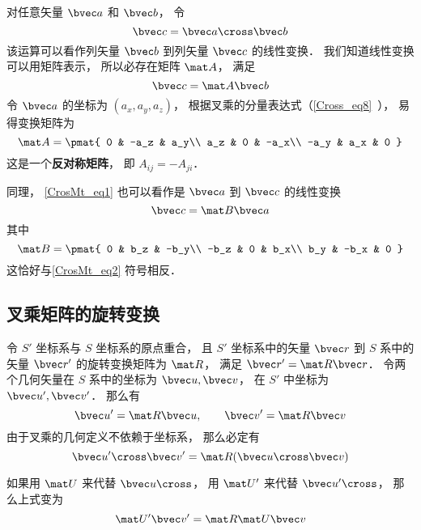 
对任意矢量 $\bvec a$ 和 $\bvec b$， 令
\begin{equation}\label{CrosMt_eq1}
\bvec c = \bvec a \cross \bvec b
\end{equation}
该运算可以看作列矢量 $\bvec b$ 到列矢量 $\bvec c$ 的线性变换． 我们知道线性变换可以用矩阵表示， 所以必存在矩阵 $\mat A$， 满足
\begin{equation}\label{CrosMt_eq3}
\bvec c = \mat A \bvec b
\end{equation}
令 $\bvec a$ 的坐标为 $(a_x, a_y, a_z)$， 根据叉乘的分量表达式（\autoref{Cross_eq8}~）， 易得变换矩阵为
\begin{equation}\label{CrosMt_eq2}
\mat A = \pmat{
0 & -a_z & a_y\\
a_z & 0 & -a_x\\
-a_y & a_x & 0
}
\end{equation}
这是一个\textbf{反对称矩阵}， 即 $A_{ij} = -A_{ji}$．

同理， \autoref{CrosMt_eq1} 也可以看作是 $\bvec a$ 到 $\bvec c$ 的线性变换
\begin{equation}
\bvec c = \mat B \bvec a
\end{equation}
其中
\begin{equation}
\mat B = \pmat{
0 & b_z & -b_y\\
-b_z & 0 & b_x\\
b_y & -b_x & 0
}
\end{equation}
这恰好与\autoref{CrosMt_eq2} 符号相反．

\subsection{叉乘矩阵的旋转变换}
令 $S'$ 坐标系与 $S$ 坐标系的原点重合， 且 $S'$ 坐标系中的矢量 $\bvec r$ 到 $S$ 系中的矢量 $\bvec r'$ 的旋转变换矩阵为 $\mat R$， 满足 $\bvec r' = \mat R\bvec r$． 令两个几何矢量在 $S$ 系中的坐标为 $\bvec u, \bvec v$， 在 $S'$ 中坐标为 $\bvec u', \bvec v'$． 那么有
\begin{equation}
\bvec u' = \mat R\bvec u, \qquad
\bvec v' = \mat R\bvec v
\end{equation}
由于叉乘的几何定义不依赖于坐标系， 那么必定有
\begin{equation}
\bvec u'\cross \bvec v' = \mat R(\bvec u\cross \bvec v)
\end{equation}

如果用 $\mat U$ 来代替 $\bvec u\cross$， 用 $\mat U'$ 来代替 $\bvec u'\cross$， 那么上式变为
\begin{equation}
\mat U' \bvec v' = \mat R \mat U \bvec v
\end{equation}

